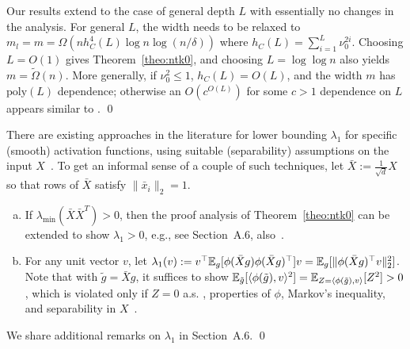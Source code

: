  
%
\begin{remark} Our results extend to the case of general depth $L$ with essentially no changes in the analysis. For general $L$, the width needs to be relaxed to $m_{l} =m= \Omega( n h_C^4(L) \log n  \log (n/\delta))$ where $h_C(L) = \sum_{i=1}^L \nu_0^{2i}$. Choosing $L = O(1)$ gives Theorem~\ref{theo:ntk0}, and choosing $L = \log \log n$ also yields $m = \widetilde{\Omega}(n)$. 
More generally, if $\nu_0^2 \leq 1$, $h_C(L) = O(L)$, and the width $m$ has $\text{poly}(L)$ dependence; otherwise an $O(c^{O(L)})$ for some $c > 1$ dependence on $L$ appears similar to \citep{SD-JL-HL-LW-XZ:19}. \qed 
\end{remark}
%
%
\begin{remark}
There are existing approaches in the literature for lower bounding $\lambda_1$ for specific (smooth) activation functions, using suitable (separability) assumptions on the input $X$~\citep{oymak2020hermite,DZ-YC-DZ-QG:20,ng2021hermite2,SD-JL-HL-LW-XZ:19}. To get an informal sense of a couple of such techniques, let $\bar{X}:=\frac{1}{\sqrt{d}}X$ so that rows of $\bar{X}$ satisfy $\|\bar{x}_i\|_2 =1$.
\begin{enumerate}[(a)]
    \item If $\lambda_{\min}(\bar{X} \bar{X}^T) > 0$, then the proof analysis of Theorem~\ref{theo:ntk0} can be extended to show $\lambda_1 > 0$, e.g., see Section~A.6, also~\citep{SD-JL-HL-LW-XZ:19}.
    \item For any unit vector $v$, let $\lambda_1(v) := v^\top \mathbb{E}_g[\phi(\bar{X}g) \phi(\bar{X}g)^\top] v = \mathbb{E}_g[ \| \phi(\bar{X}g)^\top v \|_2^2]$. Note that with $\tilde{g} = \bar{X}g$,  it suffices to show $\mathbb{E}_{\tilde{g}}[\langle \phi(\tilde{g}), v \rangle^2] = \mathbb{E}_{Z = \langle \phi(\tilde{g}), v \rangle}[Z^2] > 0$ , which is violated only if $Z=0$ a.s. , properties of $\phi$, Markov's inequality, and separability in $X$~\citep{SD-JL-HL-LW-XZ:19,oymak2020hermite,ng2021hermite2}. 
\end{enumerate}
We share additional remarks on $\lambda_1$ in Section~A.6. 
%
\qed 
\label{rem:lambda1}
\end{remark}

